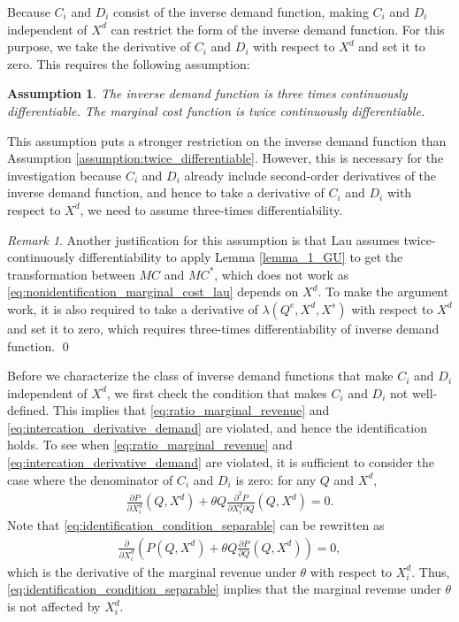 \documentclass[11pt, a4paper]{article}
\newtheorem{assumption}{Assumption}
\theoremstyle{remark}
\newtheorem{remark}{Remark}
\begin{document}
Because $C_i$ and $D_i$ consist of the inverse demand function, making $C_i$ and $D_i$ independent of $X^{d}$ can restrict the form of the inverse demand function.
For this purpose, we take the derivative of $C_i$ and $D_i$ with respect to $X^{d}$ and set it to zero.
This requires the following assumption:
\begin{assumption}\label{assumption:three_times_differentiable}
    The inverse demand function is three times continuously differentiable.
    The marginal cost function is twice continuously differentiable.
\end{assumption}
This assumption puts a stronger restriction on the inverse demand function than Assumption \ref{assumption:twice_differentiable}.
However, this is necessary for the investigation because $C_i$ and $D_i$ already include second-order derivatives of the inverse demand function, and hence to take a derivative of $C_i$ and $D_i$ with respect to $X^{d}$, we need to assume three-times differentiability.

\begin{remark}
    Another justification for this assumption is that Lau assumes twice-continuously differentiability to apply Lemma \ref{lemma_1_GU} to get the transformation between $MC$ and $MC^{*}$, which does not work as \eqref{eq:nonidentification_marginal_cost_lau} depends on $X^{d}$.
    To make the argument work, it is also required to take a derivative of $\lambda(Q^e, X^{d}, X^{s})$ with respect to $X^{d}$ and set it to zero, which requires three-times differentiability of inverse demand function.
    \qed
\end{remark}


Before we characterize the class of inverse demand functions that make $C_i$ and $D_i$ independent of $X^{d}$, we first check the condition that makes $C_i$ and $D_i$ not well-defined.
This implies that \eqref{eq:ratio_marginal_revenue} and \eqref{eq:intercation_derivative_demand} are violated, and hence the identification holds.
To see when \eqref{eq:ratio_marginal_revenue} and \eqref{eq:intercation_derivative_demand} are violated, it is sufficient to consider the case where the denominator of $C_i$ and $D_i$ is zero: for any $Q$ and $X^{d}$,
\begin{align}
    \frac{\partial P}{\partial X^{d}_i}(Q, X^{d}) + \theta Q\frac{\partial^2 P}{\partial X^{d}_{i}\partial Q}(Q, X^{d}) = 0. \label{eq:identification_condition_separable}
\end{align}
Note that \eqref{eq:identification_condition_separable} can be rewritten as
\begin{align}
    \frac{\partial }{\partial X^{d}_i}\left( P(Q, X^{d}) + \theta Q \frac{\partial P}{\partial Q}(Q, X^{d})\right) = 0,
\end{align}
which is the derivative of the marginal revenue under $\theta$ with respect to $X^{d}_i$.
Thus, \eqref{eq:identification_condition_separable} implies that the marginal revenue under $\theta$ is not affected by $X^{d}_i$.
\end{document}
